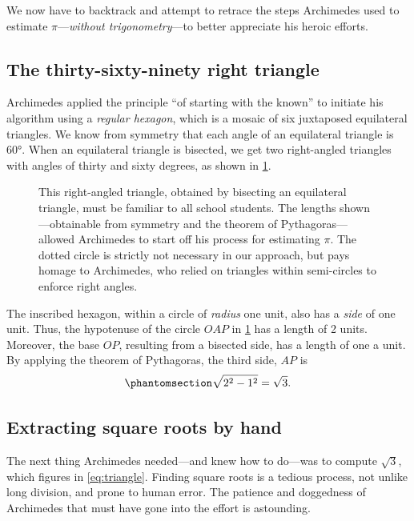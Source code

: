 \documentclass[
  a4paper,
]{article}
\begin{document}
We now have to backtrack and attempt to retrace the steps Archimedes
used to estimate \(\pi\)---\emph{without trigonometry}---to better
appreciate his heroic efforts.

\subsection{The thirty-sixty-ninety right
triangle}\label{the-thirty-sixty-ninety-right-triangle}

Archimedes applied the principle ``of starting with the known'' to
initiate his algorithm using a \emph{regular hexagon}, which is a mosaic
of six juxtaposed equilateral triangles. We know from symmetry that each
angle of an equilateral triangle is \(60°\). When an equilateral
triangle is bisected, we get two right-angled triangles with angles of
thirty and sixty degrees, as shown in \cref{fig:thirty-sixty}.

\begin{figure}
\centering

\caption{This right-angled triangle, obtained by bisecting an
equilateral triangle, must be familiar to all school students. The
lengths shown---obtainable from symmetry and the theorem of
Pythagoras---allowed Archimedes to start off his process for estimating
\(\pi\). The dotted circle is strictly not necessary in our approach,
but pays homage to Archimedes, who relied on triangles within
semi-circles to enforce right angles.}\label{fig:thirty-sixty}
\end{figure}

The inscribed hexagon, within a circle of \emph{radius} one unit, also
has a \emph{side} of one unit. Thus, the hypotenuse of the circle
\(OAP\) in \cref{fig:thirty-sixty} has a length of 2 units. Moreover,
the base \(OP\), resulting from a bisected side, has a length of one a
unit. By applying the theorem of Pythagoras, the third side, \(AP\) is
\begin{equation}\phantomsection\label{eq:triangle}{
\sqrt{2^2 - 1^2} = \sqrt{3}.
}\end{equation}

\subsection{Extracting square roots by
hand}\label{extracting-square-roots-by-hand}

The next thing Archimedes needed---and knew how to do---was to compute
\(\sqrt{3}\), which figures in \cref{eq:triangle}. Finding square roots
is a tedious process, not unlike long division, and prone to human
error. The patience and doggedness of Archimedes that must have gone
into the effort is astounding.
\end{document}
